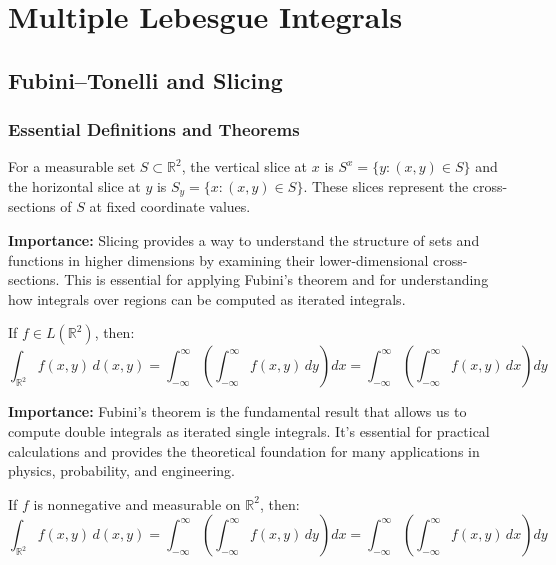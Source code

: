 \chapter{Multiple Lebesgue Integrals}


\section{Fubini--Tonelli and Slicing}

\subsection*{Essential Definitions and Theorems}

\begin{definition}
For a measurable set $S \subset \mathbb{R}^2$, the vertical slice at $x$ is $S^x = \{y : (x, y) \in S\}$ and the horizontal slice at $y$ is $S_y = \{x : (x, y) \in S\}$. These slices represent the cross-sections of $S$ at fixed coordinate values.
\end{definition}

\noindent\textbf{Importance:} Slicing provides a way to understand the structure of sets and functions in higher dimensions by examining their lower-dimensional cross-sections. This is essential for applying Fubini's theorem and for understanding how integrals over regions can be computed as iterated integrals.



\begin{theorem}
If $f \in L(\mathbb{R}^2)$, then:
\[\int_{\mathbb{R}^2} f(x, y) \, d(x, y) = \int_{-\infty}^{\infty} \left(\int_{-\infty}^{\infty} f(x, y) \, dy\right) dx = \int_{-\infty}^{\infty} \left(\int_{-\infty}^{\infty} f(x, y) \, dx\right) dy\]
\end{theorem}

\noindent\textbf{Importance:} Fubini's theorem is the fundamental result that allows us to compute double integrals as iterated single integrals. It's essential for practical calculations and provides the theoretical foundation for many applications in physics, probability, and engineering.



\begin{theorem}
If $f$ is nonnegative and measurable on $\mathbb{R}^2$, then:
\[\int_{\mathbb{R}^2} f(x, y) \, d(x, y) = \int_{-\infty}^{\infty} \left(\int_{-\infty}^{\infty} f(x, y) \, dy\right) dx = \int_{-\infty}^{\infty} \left(\int_{-\infty}^{\infty} f(x, y) \, dx\right) dy\]
\end{theorem}

